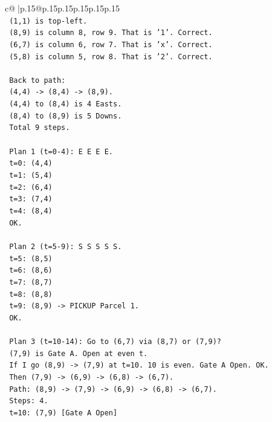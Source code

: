 \documentclass{article}
\begin{document}
{\begin{supertabular}{c@{$\;$}|p{.15\linewidth}@{}p{.15\linewidth}p{.15\linewidth}p{.15\linewidth}p{.15\linewidth}p{.15\linewidth}}
{{{\\ 
\texttt{   (1,1) is top{-}left.} \\
\texttt{   (8,9) is column 8, row 9. That is '1'. Correct.} \\
\texttt{   (6,7) is column 6, row 7. That is 'x'. Correct.} \\
\texttt{   (5,8) is column 5, row 8. That is '2'. Correct.} \\
\\ 
\texttt{   Back to path:} \\
\texttt{   (4,4) {-}> (8,4) {-}> (8,9).} \\
\texttt{   (4,4) to (8,4) is 4 Easts.} \\
\texttt{   (8,4) to (8,9) is 5 Downs.} \\
\texttt{   Total 9 steps.} \\
\\ 
\texttt{   Plan 1 (t=0{-}4): E E E E.} \\
\texttt{   t=0: (4,4)} \\
\texttt{   t=1: (5,4)} \\
\texttt{   t=2: (6,4)} \\
\texttt{   t=3: (7,4)} \\
\texttt{   t=4: (8,4)} \\
\texttt{   OK.} \\
\\ 
\texttt{   Plan 2 (t=5{-}9): S S S S S.} \\
\texttt{   t=5: (8,5)} \\
\texttt{   t=6: (8,6)} \\
\texttt{   t=7: (8,7)} \\
\texttt{   t=8: (8,8)} \\
\texttt{   t=9: (8,9) {-}> PICKUP Parcel 1.} \\
\texttt{   OK.} \\
\\ 
\texttt{   Plan 3 (t=10{-}14): Go to (6,7) via (8,7) or (7,9)?} \\
\texttt{   (7,9) is Gate A. Open at even t.} \\
\texttt{   If I go (8,9) {-}> (7,9) at t=10. 10 is even. Gate A Open. OK.} \\
\texttt{   Then (7,9) {-}> (6,9) {-}> (6,8) {-}> (6,7).} \\
\texttt{   Path: (8,9) {-}> (7,9) {-}> (6,9) {-}> (6,8) {-}> (6,7).} \\
\texttt{   Steps: 4.} \\
\texttt{   t=10: (7,9) {[}Gate A Open{]}} \\
}}}
\end{supertabular}}
\end{document}

